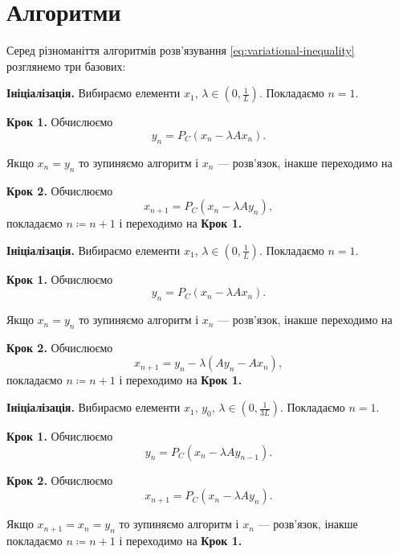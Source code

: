 \section{Алгоритми}

Серед різноманіття алгоритмів розв'язування \eqref{eq:variational-inequality} розглянемо три базових:

\begin{algorithm}[Корпелевич]
    \label{algo:korpelevich}
    \textbf{Ініціалізація.} Вибираємо елементи $x_1$, $\lambda \in \left( 0, \frac{1}{L} \right)$. Покладаємо $n = 1$. \medskip

    \textbf{Крок 1.} Обчислюємо
    \begin{equation}
        y_n = P_C (x_n - \lambda A x_n).
    \end{equation}
    
    Якщо $x_n = y_n$ то зупиняємо алгоритм і $x_n$ --- розв'язок, інакше переходимо на \medskip
    
    \textbf{Крок 2.} Обчислюємо
    \begin{equation}
        x_{n + 1} = P_C (x_n - \lambda A y_n),
    \end{equation}
    покладаємо $n \coloneqq n + 1$ і переходимо на \textbf{Крок 1.}
\end{algorithm}

\begin{algorithm}[P. Tseng]
    \label{algo:tseng}
    \textbf{Ініціалізація.} Вибираємо елементи $x_1$, $\lambda \in \left( 0, \frac{1}{L} \right)$. Покладаємо $n = 1$. \medskip

    \textbf{Крок 1.} Обчислюємо
    \begin{equation}
        y_n = P_C (x_n - \lambda A x_n).
    \end{equation}
    
    Якщо $x_n = y_n$ то зупиняємо алгоритм і $x_n$ --- розв'язок, інакше переходимо на \medskip
    
    \textbf{Крок 2.} Обчислюємо
    \begin{equation}
        x_{n + 1} = y_n - \lambda (A y_n - A x_n),
    \end{equation}
    покладаємо $n \coloneqq n + 1$ і переходимо на \textbf{Крок 1.}
\end{algorithm}

\begin{algorithm}[Попов]
    \label{algo:popov}
    \textbf{Ініціалізація.} Вибираємо елементи $x_1$, $y_0$, $\lambda \in \left( 0, \frac{1}{3L} \right)$. Покладаємо $n = 1$. \medskip

    \textbf{Крок 1.} Обчислюємо
    \begin{equation}
        y_n = P_C (x_n - \lambda A y_{n - 1}).
    \end{equation}
    
    \textbf{Крок 2.} Обчислюємо
    \begin{equation}
        x_{n + 1} = P_C (x_n - \lambda A y_n).
    \end{equation}
    
    Якщо $x_{n + 1} = x_n = y_n$ то зупиняємо алгоритм і $x_n$ --- розв'язок, інакше покладаємо $n \coloneqq n + 1$ і переходимо на \textbf{Крок 1.}
\end{algorithm}

